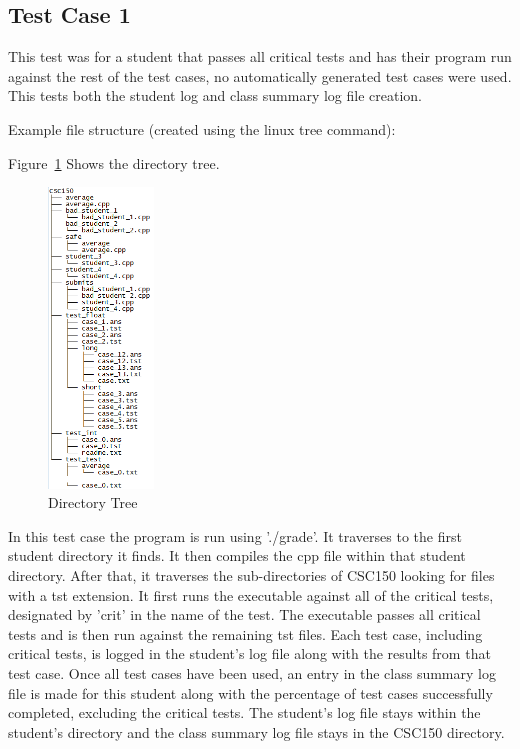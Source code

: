 \subsection{Test Case 1}
This test was for a student that passes all critical tests and has their program run against the rest of the test cases, no automatically generated test cases were used. This tests both the student log and class summary log file creation.

Example file structure (created using the linux tree command):


Figure~\ref{directory_tree} Shows the directory tree.

\begin{figure}[H]
\begin{center}
\includegraphics[width=0.25\textwidth]{./directory_tree}
\end{center}
\caption{Directory Tree \label{directory_tree}}
\end{figure}


In this test case the program is run using './grade'. It traverses to the first student directory it finds. It then compiles the cpp file within that student directory. After that, it traverses the sub-directories of CSC150 looking for files with a tst extension. It first runs the executable against all of the critical tests, designated by 'crit' in the name of the test. The executable passes all critical tests and is then run against the remaining tst files. Each test case, including critical tests, is logged in the student's log file along with the results from that test case. Once all test cases have been used, an entry in the class summary log file is made for this student along with the percentage of test cases successfully completed, excluding the critical tests. The student's log file stays within the student's directory and the class summary log file stays in the CSC150 directory.

